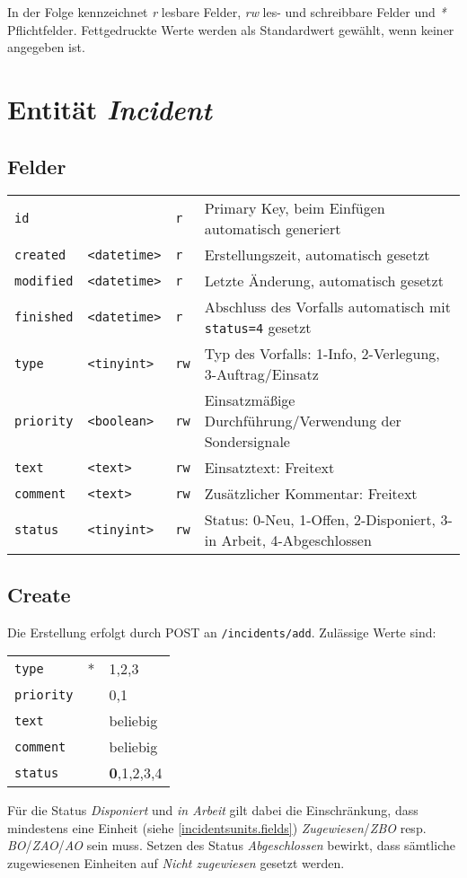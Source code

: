 \documentclass[a4paper,11pt]{article}
\newcommand{\fielddef}[4]{\texttt{\small #1} & \texttt{\small <#2>} & \texttt{\small #3} & \footnotesize{#4} \\}
\newcommand{\validator}[3][]{\texttt{\small #2} & #1 & \small{#3} \\}
\begin{document}
\bigskip In der Folge kennzeichnet \emph{r} lesbare Felder, \emph{rw} les- und schreibbare Felder und \emph{*} Pflichtfelder. Fettgedruckte Werte werden als Standardwert gewählt, wenn keiner angegeben ist.

\section{Entität \emph{Incident}}

\subsection{Felder}

\begin{tabular}{llll}
\fielddef{id}   {unsigned int} {r}  {Primary Key, beim Einfügen automatisch generiert}
\fielddef{created}  {datetime} {r}  {Erstellungszeit, automatisch gesetzt}
\fielddef{modified} {datetime} {r}  {Letzte Änderung, automatisch gesetzt}
\fielddef{finished} {datetime} {r}  {Abschluss des Vorfalls automatisch mit \texttt{status=4} gesetzt}
\fielddef{type}     {tinyint}  {rw} {Typ des Vorfalls: 1-Info, 2-Verlegung, 3-Auftrag/Einsatz}
\fielddef{priority} {boolean}  {rw} {Einsatzmäßige Durchführung/Verwendung der Sondersignale}
\fielddef{text}     {text}     {rw} {Einsatztext: Freitext}
\fielddef{comment}  {text}     {rw} {Zusätzlicher Kommentar: Freitext}
\fielddef{status}   {tinyint}  {rw} {Status: 0-Neu, 1-Offen, 2-Disponiert, 3-in Arbeit, 4-Abgeschlossen}
\end{tabular}

\subsection{Create}\label{incidents.create}

Die Erstellung erfolgt durch POST an \texttt{/incidents/add}. Zulässige Werte sind:

\smallskip\noindent\begin{tabular}{lcl}
\validator[*]{type}{1,2,3}
\validator{priority}{0,1}
\validator{text}{beliebig}
\validator{comment}{beliebig}
\validator{status}{\textbf{0},1,2,3,4}
\end{tabular}\smallskip

Für die Status \emph{Disponiert} und \emph{in Arbeit} gilt dabei die Einschränkung, dass mindestens eine Einheit (siehe \ref{incidentsunits.fields}) \emph{Zugewiesen}/\emph{ZBO} resp. \emph{BO}/\emph{ZAO}/\emph{AO} sein muss. Setzen des Status \emph{Abgeschlossen} bewirkt, dass sämtliche zugewiesenen Einheiten auf \emph{Nicht zugewiesen} gesetzt werden.
\end{document}
